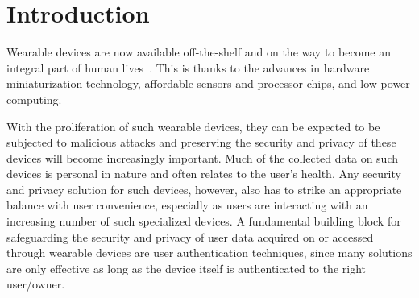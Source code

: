 \section{Introduction}\label{sec:intro}

Wearable devices are now available off-the-shelf and on the way to become an integral part of human
lives~\cite{googleglass,smartwatch,fitbit}.  This is thanks to the advances in hardware miniaturization technology, affordable
sensors and processor chips, and low-power computing.


With the proliferation of such wearable devices, they can be expected to be subjected to malicious attacks and preserving the security and privacy of these devices will become increasingly important.
Much of the collected data on such devices is personal in nature and often relates to the user's health. Any security and privacy solution for such devices, however, also has to strike an appropriate balance with user convenience, especially as users are interacting with an increasing number of such specialized devices. A fundamental building block for safeguarding the security and privacy of user data acquired on or accessed through wearable devices are user authentication techniques, since many solutions are only effective as long as the device itself is authenticated to the right user/owner.

